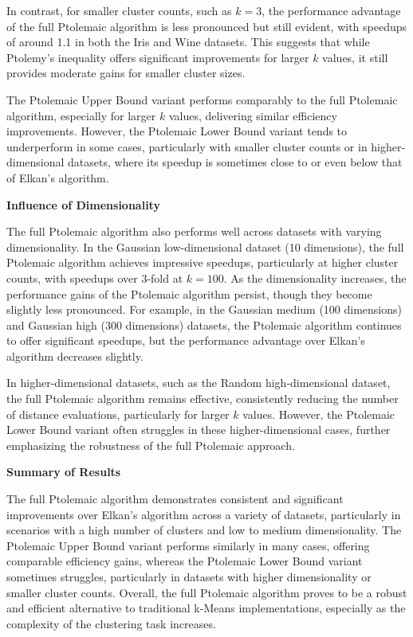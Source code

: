 In contrast, for smaller cluster counts, such as $k = 3$, the performance advantage of the full Ptolemaic algorithm is less pronounced but still evident, with speedups of around 1.1 in both the Iris and Wine datasets. This suggests that while Ptolemy’s inequality offers significant improvements for larger $k$ values, it still provides moderate gains for smaller cluster sizes.

The Ptolemaic Upper Bound variant performs comparably to the full Ptolemaic algorithm, especially for larger $k$ values, delivering similar efficiency improvements. However, the Ptolemaic Lower Bound variant tends to underperform in some cases, particularly with smaller cluster counts or in higher-dimensional datasets, where its speedup is sometimes close to or even below that of Elkan’s algorithm.

\textbf{Influence of Dimensionality}

The full Ptolemaic algorithm also performs well across datasets with varying dimensionality. In the Gaussian low-dimensional dataset (10 dimensions), the full Ptolemaic algorithm achieves impressive speedups, particularly at higher cluster counts, with speedups over 3-fold at $k = 100$. As the dimensionality increases, the performance gains of the Ptolemaic algorithm persist, though they become slightly less pronounced. For example, in the Gaussian medium (100 dimensions) and Gaussian high (300 dimensions) datasets, the Ptolemaic algorithm continues to offer significant speedups, but the performance advantage over Elkan’s algorithm decreases slightly.

In higher-dimensional datasets, such as the Random high-dimensional dataset, the full Ptolemaic algorithm remains effective, consistently reducing the number of distance evaluations, particularly for larger $k$ values. However, the Ptolemaic Lower Bound variant often struggles in these higher-dimensional cases, further emphasizing the robustness of the full Ptolemaic approach.

\textbf{Summary of Results}

The full Ptolemaic algorithm demonstrates consistent and significant improvements over Elkan’s algorithm across a variety of datasets, particularly in scenarios with a high number of clusters and low to medium dimensionality. The Ptolemaic Upper Bound variant performs similarly in many cases, offering comparable efficiency gains, whereas the Ptolemaic Lower Bound variant sometimes struggles, particularly in datasets with higher dimensionality or smaller cluster counts. Overall, the full Ptolemaic algorithm proves to be a robust and efficient alternative to traditional k-Means implementations, especially as the complexity of the clustering task increases.

